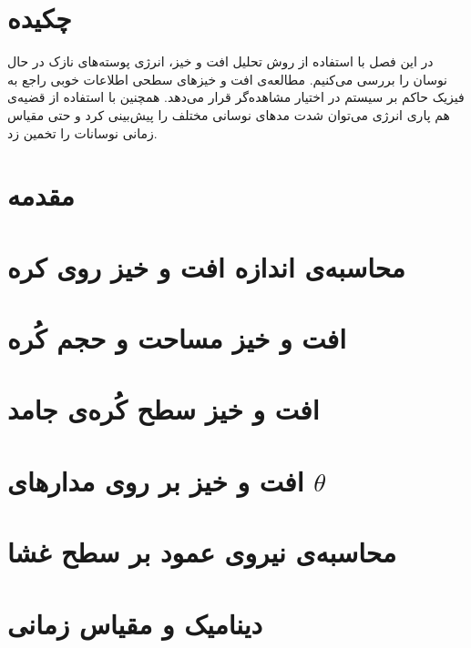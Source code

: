 \setRL
\clearpage
\def \MemFluc {\Mempath /MembraneFluc}

\section{
چکیده
}
در این فصل با استفاده از روش تحلیل افت و خیز، انرژی پوسته‌های نازک در حال نوسان را بررسی می‌کنیم. مطالعه‌ی افت و خیز‌های سطحی اطلاعات خوبی راجع به فیزیک حاکم بر سیستم در اختیار مشاهده‌گر قرار می‌دهد. همچنین با استفاده از قضیه‌ی هم پاری انرژی می‌توان شدت‌ مد‌های نوسانی مختلف را پیش‌بینی کرد و حتی مقیاس زمانی نوسانات را تخمین زد.

\section{
مقدمه
}



\section{
محاسبه‌ی اندازه افت و خیز روی کره
\label{sec:bendingFluctuations}
}


\section{
افت و خیز مساحت و حجم کُره
}


\section{
افت و خیز سطح کُره‌ی جامد
}


\section{
افت و خیز بر روی مدارهای
$\theta$
}


\section{
محاسبه‌ی نیروی عمود بر سطح غشا
\label{sec:NormalForceDerivation}}


\section{
دینامیک و مقیاس زمانی
}







